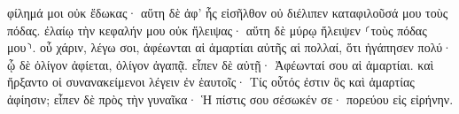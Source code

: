 \documentclass{openreader}
\begin{document}
φίλημά μοι οὐκ ἔδωκας· αὕτη δὲ ἀφ’ ἧς εἰσῆλθον οὐ διέλιπεν καταφιλοῦσά μου τοὺς πόδας. 
ἐλαίῳ τὴν κεφαλήν μου οὐκ ἤλειψας· αὕτη δὲ μύρῳ ἤλειψεν ⸂τοὺς πόδας μου⸃. 
οὗ χάριν, λέγω σοι, ἀφέωνται αἱ ἁμαρτίαι αὐτῆς αἱ πολλαί, ὅτι ἠγάπησεν πολύ· ᾧ δὲ ὀλίγον ἀφίεται, ὀλίγον ἀγαπᾷ. 
εἶπεν δὲ αὐτῇ· Ἀφέωνταί σου αἱ ἁμαρτίαι. 
καὶ ἤρξαντο οἱ συνανακείμενοι λέγειν ἐν ἑαυτοῖς· Τίς οὗτός ἐστιν ὃς καὶ ἁμαρτίας ἀφίησιν; 
εἶπεν δὲ πρὸς τὴν γυναῖκα· Ἡ πίστις σου σέσωκέν σε· πορεύου εἰς εἰρήνην. 
\end{document}
